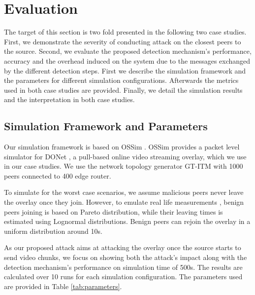 \section{Evaluation}
\label{sec:eval}

The target of this section is two fold presented in the following two case studies.
First, we demonstrate the severity of conducting \drop attack on the closest peers to the source.
Second, we evaluate the proposed detection mechanism's performance, accuracy and the overhead induced on the system due to the messages exchanged by the different detection steps.
First we describe the simulation framework and the parameters for different simulation configurations. Afterwards the metrics used in both case studies are provided.
Finally, we detail the simulation results and the interpretation in both case studies.

\subsection{Simulation Framework and Parameters}
Our simulation framework is based on OSSim \cite{nguyen2013ossim}. 
OSSim provides a packet level simulator for DONet \cite{zhang2005coolstreaming}, a pull-based online video streaming overlay, which we use in our case studies.
We use the network topology generator GT-ITM \cite{GT} with 1000 peers connected to 400 edge router.

To simulate for the worst case scenarios, we assume malicious peers never leave the overlay once they join.
However, to emulate real life measurements \cite{distribution}, benign peers joining is based on Pareto distribution, while their leaving times is estimated using Lognormal distributions.
Benign peers can rejoin the overlay in a uniform distribution around 10s.

As our proposed attack aims at attacking the overlay once the source starts to send video chunks, we focus on showing both the attack's impact along with the detection mechanism's performance on simulation time of 500s.
The results are calculated over 10 runs for each simulation configuration.
The parameters used are provided in Table \ref{tab:parameters}.

